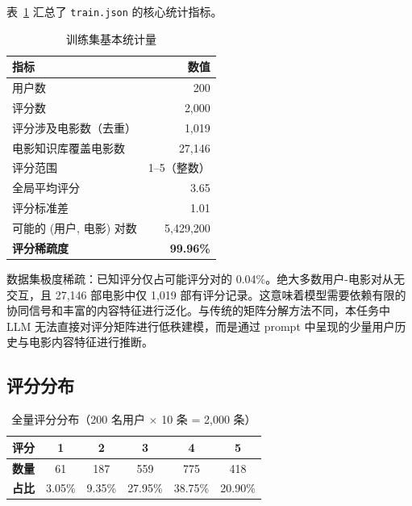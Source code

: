 \documentclass[UTF8,a4paper,10pt]{ctexart}
\begin{document}
表~\ref{tab:basic_stats} 汇总了 \texttt{train.json} 的核心统计指标。

\begin{table}[htbp]
    \centering
    \setlength{\tabcolsep}{32pt}
    \caption{训练集基本统计量}
    \label{tab:basic_stats}
    \begin{tabular}{@{}lr@{}}
        \toprule
        \textbf{指标} & \textbf{数值} \\
        \midrule
        用户数 & 200 \\
        评分数 & 2,000 \\
        评分涉及电影数（去重） & 1,019 \\
        电影知识库覆盖电影数 & 27,146 \\
        \midrule
        评分范围 & 1--5（整数） \\
        全局平均评分 & 3.65 \\
        评分标准差 & 1.01 \\
        可能的 (用户, 电影) 对数 & 5,429,200 \\
        \textbf{评分稀疏度} & \textbf{99.96\%} \\
        \bottomrule
    \end{tabular}
\end{table}

数据集极度稀疏：已知评分仅占可能评分对的 0.04\%。绝大多数用户-电影对从无交互，且 27,146 部电影中仅 1,019 部有评分记录。这意味着模型需要依赖有限的协同信号和丰富的内容特征进行泛化。与传统的矩阵分解方法不同，本任务中 LLM 无法直接对评分矩阵进行低秩建模，而是通过 prompt 中呈现的少量用户历史与电影内容特征进行推断。

\subsection{评分分布}

\begin{table}[htbp]
    \centering
    \setlength{\tabcolsep}{28pt}
    \caption{全量评分分布（200 名用户 $\times$ 10 条 = 2,000 条）}
    \label{tab:rating_dist}
    \begin{tabular}{@{}lccccc@{}}
        \toprule
        \textbf{评分} & 1 & 2 & 3 & 4 & 5 \\
        \midrule
        \textbf{数量} & 61 & 187 & 559 & 775 & 418 \\
        \textbf{占比} & 3.05\% & 9.35\% & 27.95\% & 38.75\% & 20.90\% \\
        \bottomrule
    \end{tabular}
\end{table}
\end{document}
